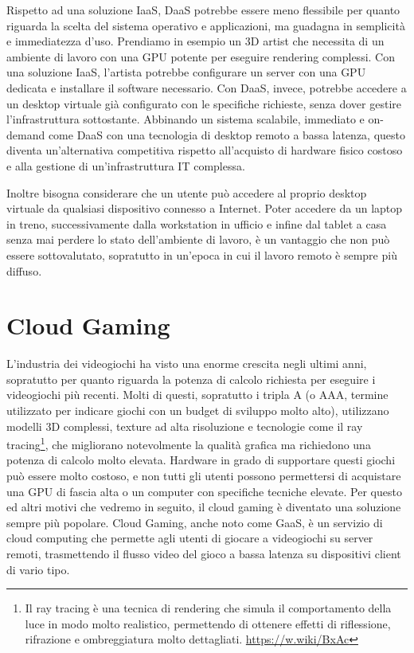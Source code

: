\documentclass[12pt,a4paper,openright,twoside]{book}
\begin{document}
Rispetto ad una soluzione \ac{IaaS}, DaaS potrebbe essere meno flessibile per quanto riguarda la scelta del sistema operativo e applicazioni, ma guadagna in semplicità e immediatezza d'uso.
Prendiamo in esempio un 3D artist che necessita di un ambiente di lavoro con una GPU potente per eseguire rendering complessi. Con una soluzione \ac{IaaS}, l'artista potrebbe configurare un server con una GPU dedicata e installare il software necessario. Con DaaS, invece, potrebbe accedere a un desktop virtuale già configurato con le specifiche richieste, senza dover gestire l'infrastruttura sottostante.
Abbinando un sistema scalabile, immediato e on-demand come DaaS con una tecnologia di desktop remoto a bassa latenza, questo diventa un'alternativa competitiva rispetto all'acquisto di hardware fisico costoso e alla gestione di un'infrastruttura IT complessa.

Inoltre bisogna considerare che un utente può accedere al proprio desktop virtuale da qualsiasi dispositivo connesso a Internet.
Poter accedere da un laptop in treno, successivamente dalla workstation in ufficio e infine dal tablet a casa senza mai perdere lo stato dell'ambiente di lavoro, è un vantaggio che non può essere sottovalutato, sopratutto in un'epoca in cui il lavoro remoto è sempre più diffuso.

\section{Cloud Gaming}
\label{sec:cloud-gaming}
L'industria dei videogiochi ha visto una enorme crescita negli ultimi anni, sopratutto per quanto riguarda la potenza di calcolo richiesta per eseguire i videogiochi più recenti. Molti di questi, sopratutto i tripla A (o AAA, termine utilizzato per indicare giochi con un budget di sviluppo molto alto), utilizzano modelli 3D complessi, texture ad alta risoluzione e tecnologie come il ray tracing\footnote{Il ray tracing è una tecnica di rendering che simula il comportamento della luce in modo molto realistico, permettendo di ottenere effetti di riflessione, rifrazione e ombreggiatura molto dettagliati. \url{https://w.wiki/BxAc}}, che migliorano notevolmente la qualità grafica ma richiedono una potenza di calcolo molto elevata.
Hardware in grado di supportare questi giochi può essere molto costoso, e non tutti gli utenti possono permettersi di acquistare una GPU di fascia alta o un computer con specifiche tecniche elevate.
Per questo ed altri motivi che vedremo in seguito, il cloud gaming è diventato una soluzione sempre più popolare.
Cloud Gaming, anche noto come \ac{GaaS}, è un servizio di cloud computing che permette agli utenti di giocare a videogiochi su server remoti, trasmettendo il flusso video del gioco a bassa latenza su dispositivi client di vario tipo. \cite{HARLE2023}
\end{document}
